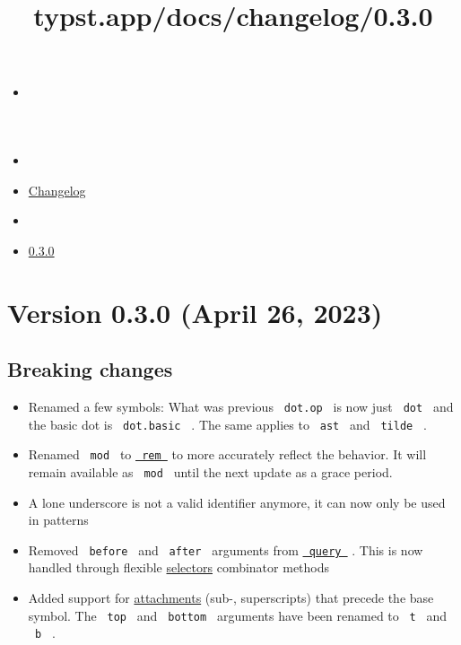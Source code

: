 \title{typst.app/docs/changelog/0.3.0}

\begin{itemize}
\tightlist
\item
  \href{/docs}{}
\item
  
\item
  \href{/docs/changelog/}{Changelog}
\item
  
\item
  \href{/docs/changelog/0.3.0/}{0.3.0}
\end{itemize}

\section{Version 0.3.0 (April 26,
2023)}\label{version-0.3.0-april-26-2023}

\subsection{Breaking changes}\label{breaking-changes}

\begin{itemize}
\tightlist
\item
  Renamed a few symbols: What was previous \texttt{\ dot.op\ } is now
  just \texttt{\ dot\ } and the basic dot is \texttt{\ dot.basic\ } .
  The same applies to \texttt{\ ast\ } and \texttt{\ tilde\ } .
\item
  Renamed \texttt{\ mod\ } to
  \href{/docs/reference/foundations/calc/\#functions-rem}{\texttt{\ rem\ }}
  to more accurately reflect the behavior. It will remain available as
  \texttt{\ mod\ } until the next update as a grace period.
\item
  A lone underscore is not a valid identifier anymore, it can now only
  be used in patterns
\item
  Removed \texttt{\ before\ } and \texttt{\ after\ } arguments from
  \href{/docs/reference/introspection/query/}{\texttt{\ query\ }} . This
  is now handled through flexible
  \href{/docs/reference/foundations/selector/}{selectors} combinator
  methods
\item
  Added support for
  \href{/docs/reference/math/attach/\#functions-attach}{attachments}
  (sub-, superscripts) that precede the base symbol. The
  \texttt{\ top\ } and \texttt{\ bottom\ } arguments have been renamed
  to \texttt{\ t\ } and \texttt{\ b\ } .
\end{itemize}

